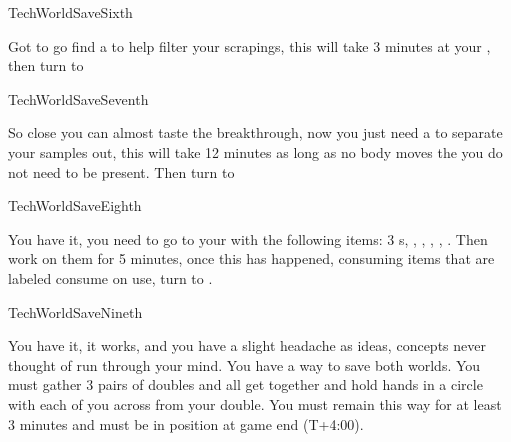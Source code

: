 \documentclass[greennotebook]{guildcamp3} %
\begin{document}
\begin{page}{TechWorldSaveSixth}
	
	 Got to go find a  \iSieve{} to help filter your scrapings, this will take 3 minutes at your \sTechWorkbench{}, then turn to  
	
\end{page}

\begin{page}{TechWorldSaveSeventh}
	
	So close you can almost taste the breakthrough, now you just need a \iCentrifuge{} to separate your samples out, this will take 12 minutes as long as no body moves the \iCentrifuge{} you do not need to be present. Then turn to  
	
\end{page}

\begin{page}{TechWorldSaveEighth}
	
	 You have it, you need to go to your \sTechWorkbench{} with the following items: 3 \iTFResistor{}s, \iScrapMetal{}, \iCog{}, \iCircuitBoard{}, \iFlashlight{}, \iMultitool{}. Then work on them for 5 minutes, once this has happened, consuming items that are labeled consume on use, turn to .
	
\end{page}

\begin{page}{TechWorldSaveNineth}
	
	You have it, it works, and you have a slight headache as ideas, concepts never thought of run through your mind. You have a way to save both worlds.  You must gather 3 pairs of doubles and all get together and hold hands in a circle with each of you across from your double. You must remain this way for at least 3 minutes and must be in position at game end (T+4:00).
	
\end{page}

\endnotebook
\end{document}
